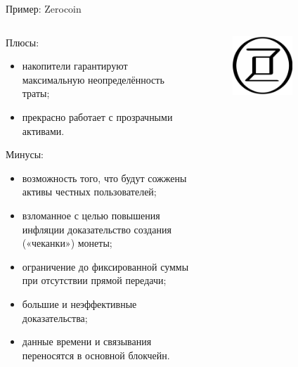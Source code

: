 \documentclass[aspectratio=169]{beamer}
\begin{document}
\begin{frame}{Пример: Zerocoin}
\begin{columns}
\begin{column}{0.7\textwidth}
Плюсы:
\begin{itemize}
\item накопители гарантируют максимальную неопределённость траты;
\item прекрасно работает с прозрачными активами.
\end{itemize}

Минусы:
\begin{itemize}
\item возможность того, что будут сожжены активы честных пользователей;
\item взломанное с целью повышения инфляции доказательство создания («чеканки») монеты;
\item ограничение до фиксированной суммы при отсутствии прямой передачи;
\item большие и неэффективные доказательства;
\item данные времени и связывания переносятся в основной блокчейн.
\end{itemize}
\end{column}
\begin{column}{0.3\textwidth}
\begin{figure}
\includegraphics[width=0.6\textwidth]{zerocoin.png}
\end{figure}
\end{column}
\end{columns}
\end{frame}
\end{document}
